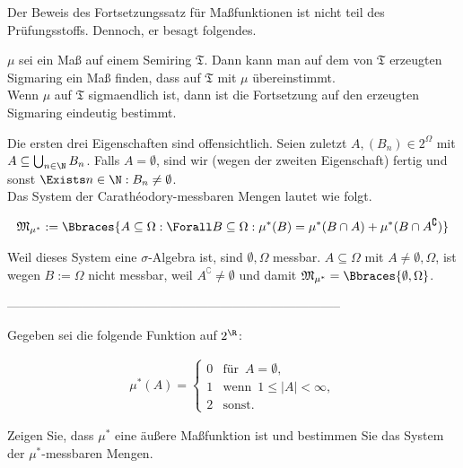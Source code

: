 \begin{solution}
\begin{itemize}
\end{itemize}

Der Beweis des Fortsetzungssatz für Maßfunktionen ist nicht teil des Prüfungsstoffs. Dennoch, er besagt folgendes.

\begin{theorem*}

$\mu$ sei ein Maß auf einem Semiring $\mathfrak{T}$. Dann kann man auf dem von $\mathfrak{T}$ erzeugten Sigmaring ein Maß finden, dass auf $\mathfrak{T}$ mit $\mu$ übereinstimmt. \\
Wenn $\mu$ auf $\mathfrak{T}$ sigmaendlich ist, dann ist die Fortsetzung auf den erzeugten Sigmaring eindeutig bestimmt.

\end{theorem*}

Die ersten drei Eigenschaften sind offensichtlich. Seien zuletzt $A, (B_n) \in 2^\Omega$ mit $A \subseteq \bigcup_{n \in \N} B_n$. Falls $A = \emptyset$, sind wir (wegen der zweiten Eigenschaft) fertig und sonst $\Exists n \in \N: B_n \neq \emptyset$. \\

Das System der Carathéodory-messbaren Mengen lautet wie folgt.

\begin{align*}
  \mathfrak{M}_{\mu^\ast} :=
  \Bbraces
  {
    A \subseteq \Omega:
    \Forall B \subseteq \Omega:
    \mu^\ast(B) = \mu^\ast(B \cap A) + \mu^\ast(B \cap A^\complement)
  }
\end{align*}

Weil dieses System eine $\sigma$-Algebra ist, sind $\emptyset, \Omega$ messbar. $A \subseteq \Omega$ mit $A \neq \emptyset, \Omega$, ist wegen $B := \Omega$ nicht messbar, weil $A^\complement \neq \emptyset$ und damit $\mathfrak{M}_{\mu^\ast} = \Bbraces{\emptyset, \Omega}$.

\end{solution}

--------------------------------------------------------------------------------

\begin{exercise}

Gegeben sei die folgende Funktion auf $2^\R$:

\begin{align*}
  \mu^\ast(A) =
  \begin{cases}
    0 & \text{für} \enspace A = \emptyset, \\
    1 & \text{wenn} \enspace 1 \leq |A| < \infty, \\
    2 & \text{sonst}.
  \end{cases}
\end{align*}

Zeigen Sie, dass $\mu^\ast$ eine äußere Maßfunktion ist und bestimmen Sie das System der $\mu^\ast$-messbaren Mengen.

\end{exercise}

